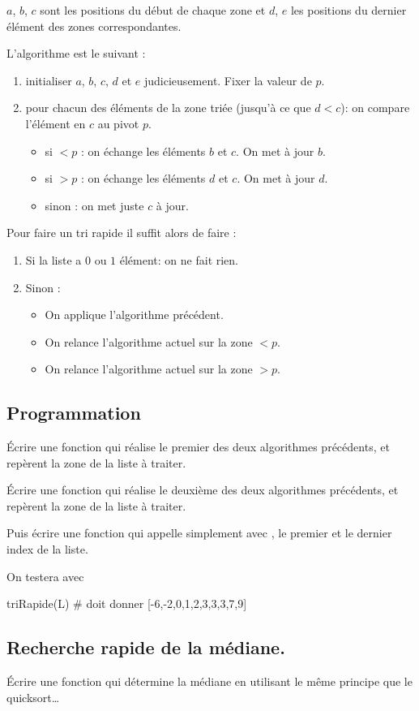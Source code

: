 \documentclass[french,12pt,twoside]{VcCours}
\begin{document}
$a$, $b$, $c$ sont les positions du début de chaque zone et  $d$, $e$ les 
positions du dernier élément des zones correspondantes.

L'algorithme est le suivant :
\begin{enumerate}
  \item initialiser $a$, $b$, $c$, $d$ et $e$ judicieusement. Fixer la valeur de 
  $p$.
  \item pour chacun des éléments de la zone triée (jusqu'à ce que $d<c$): on 
  compare l'élément en $c$ au pivot $p$.
  \begin{itemize}
    \item si $<p$ : on échange les éléments $b$ et $c$. On met à jour $b$.
    \item si $>p$ : on échange les éléments $d$ et $c$. On met à jour $d$.
    \item sinon : on met juste $c$ à jour.
  \end{itemize}
\end{enumerate}
 
Pour faire un tri rapide il suffit alors de faire :
\begin{enumerate}
  \item Si la liste a $0$ ou $1$ élément: on ne fait rien.
  \item Sinon :
    \begin{itemize}
    \item On applique l'algorithme précédent.
    \item On relance l'algorithme actuel sur la zone $<p$.
    \item On relance l'algorithme actuel sur la zone $>p$.
  \end{itemize}
\end{enumerate}
 

\subsection{Programmation}
\begin{Exercice}
Écrire une fonction  qui réalise le 
premier des deux algorithmes précédents,  et  repèrent 
la zone de la liste à traiter.

Écrire une fonction  qui réalise le 
deuxième des deux algorithmes précédents,  et  repèrent 
la zone de la liste à traiter.

Puis écrire une fonction  qui appelle simplement 
 avec , le premier et le dernier index de la 
liste.

On testera avec 
\end{Exercice}
\begin{Python}
triRapide(L) # doit donner [-6,-2,0,1,2,3,3,3,7,9]
\end{Python}

\subsection{Recherche rapide de la médiane.}
\begin{Exercice}
Écrire une fonction  qui détermine la médiane en utilisant le 
même principe que le quicksort\ldots
\end{Exercice}
\end{document}
